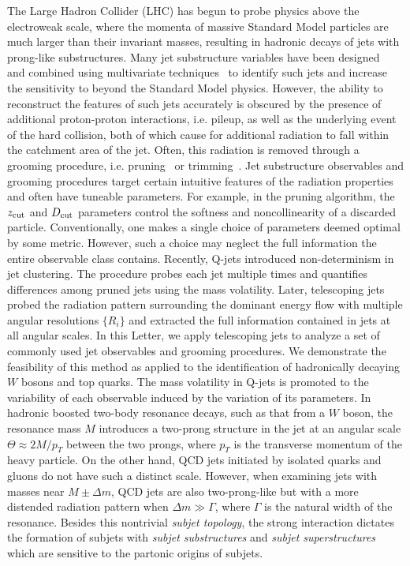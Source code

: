 \documentclass[aps,prl,floatfix,preprintnumbers,twocolumn,groupedaddress,nofootinbib]{revtex4-1}
\begin{document}
The Large Hadron Collider (LHC) has begun to probe physics above the electroweak scale, where the momenta of massive Standard Model particles are much larger than their invariant masses, resulting in hadronic decays of jets with prong-like substructures. Many jet substructure variables have been designed~\cite{Abdesselam:2010pt,Altheimer:2012mn,Altheimer:2013yza} and combined using multivariate techniques~\cite{Adams:2015hiv,Larkoski:2017jix,ATLAS-CONF-2017-064,Khachatryan:1955546} to identify such jets and increase the sensitivity to beyond the Standard Model physics. However, the ability to reconstruct the features of such jets accurately is obscured by the presence of additional proton-proton interactions, i.e. pileup, as well as the underlying event of the hard collision, both of which cause for additional radiation to fall within the catchment area of the jet. Often, this radiation is removed through a grooming procedure, i.e. pruning~\cite{Ellis:2009su} or trimming~\cite{Krohn:2009th}. Jet substructure observables and grooming procedures target certain intuitive features of the radiation properties and often have tuneable parameters. For example, in the pruning algorithm, the $z_{\rm cut}$ and $D_{\rm cut}$ parameters control the softness and noncollinearity of a discarded particle. Conventionally, one makes a single choice of parameters deemed optimal by some metric. However, such a choice may neglect the full information the entire observable class contains.
\newline \indent Recently, Q-jets \cite{Ellis:2012sn} introduced non-determinism in jet clustering. The procedure probes each jet multiple times and quantifies differences among pruned jets using the mass volatility. Later, telescoping jets \cite{Chien:2014hla} probed the radiation pattern surrounding the dominant energy flow with multiple angular resolutions $\{R_i\}$ and extracted the full information contained in jets at all angular scales. In this Letter, we apply telescoping jets to analyze a set of commonly used jet observables and grooming procedures. We demonstrate the feasibility of this method as applied to the identification of hadronically decaying $W$ bosons and top quarks. The mass volatility in Q-jets is promoted to the variability of each observable induced by the variation of its parameters.
\newline \indent In hadronic boosted two-body resonance decays, such as that from a $W$ boson, the resonance mass $M$ introduces a two-prong structure in the jet at an angular scale $\Theta\approx 2M/p_T$ between the two prongs, where $p_T$ is the transverse momentum of the heavy particle. On the other hand, QCD jets initiated by isolated quarks and gluons do not have such a distinct scale. However, when examining jets with masses near $M\pm\Delta m$, QCD jets are also two-prong-like but with a more distended radiation pattern when $\Delta m\gg\Gamma$, where $\Gamma$ is the natural width of the resonance. Besides this nontrivial {\sl subjet topology}, the strong interaction dictates the formation of subjets with {\sl subjet substructures} and {\sl subjet superstructures} \cite{Gallicchio:2010sw} which are sensitive to the partonic origins of subjets.
\end{document}
